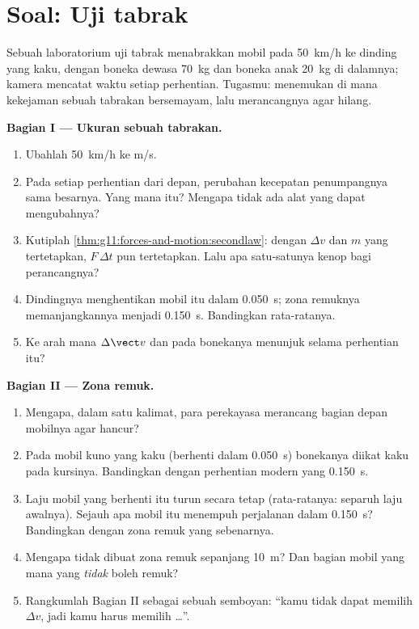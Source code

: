 \section{Soal: Uji tabrak}

\begin{problem}
\label{pb:g11:forces-and-motion:1}
Sebuah laboratorium uji tabrak menabrakkan mobil pada \qty{50}{km/h} ke
dinding yang kaku, dengan boneka dewasa \qty{70}{kg} dan boneka anak
\qty{20}{kg} di dalamnya; kamera mencatat waktu setiap perhentian.
Tugasmu: menemukan di mana kekejaman sebuah tabrakan bersemayam, lalu
merancangnya agar hilang.

\medskip
\noindent\textbf{Bagian I --- Ukuran sebuah tabrakan.}
\begin{enumerate}
  \item Ubahlah \qty{50}{km/h} ke \unit{m/s}.
  \item Pada setiap perhentian dari depan, perubahan kecepatan
        penumpangnya sama besarnya. Yang mana itu? Mengapa tidak ada
        alat yang dapat mengubahnya?
  \item Kutiplah \cref{thm:g11:forces-and-motion:secondlaw}: dengan
        $\Delta v$ dan $m$ yang tertetapkan, $F\,\Delta t$ pun
        tertetapkan. Lalu apa satu-satunya kenop bagi perancangnya?
  \item Dindingnya menghentikan mobil itu dalam \qty{0.050}{s}; zona
        remuknya memanjangkannya menjadi \qty{0.150}{s}. Bandingkan 
        rata-ratanya.
  \item Ke arah mana $\Delta \vect v$ dan  pada bonekanya
        menunjuk selama perhentian itu?
\end{enumerate}

\medskip
\noindent\textbf{Bagian II --- Zona remuk.}
\begin{enumerate}[resume]
  \item Mengapa, dalam satu kalimat, para perekayasa merancang bagian
        depan mobilnya agar hancur?
  \item Pada mobil kuno yang kaku (berhenti dalam \qty{0.050}{s})
        bonekanya diikat kaku pada kursinya. Bandingkan  dengan
        perhentian modern yang \qty{0.150}{s}.
  \item Laju mobil yang berhenti itu turun secara tetap (rata-ratanya:
        separuh laju awalnya). Sejauh apa mobil itu menempuh perjalanan
        dalam \qty{0.150}{s}? Bandingkan dengan zona remuk yang
        sebenarnya.
  \item Mengapa tidak dibuat zona remuk sepanjang \qty{10}{m}? Dan
        bagian mobil yang mana yang \emph{tidak} boleh remuk?
  \item Rangkumlah Bagian II sebagai sebuah semboyan: ``kamu tidak
        dapat memilih $\Delta v$, jadi kamu harus memilih \dots''.
\end{enumerate}


\end{problem}
